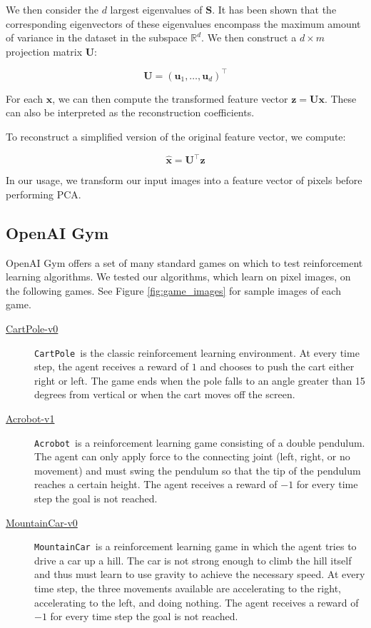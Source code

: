 \documentclass[11pt]{article}
\newcommand{\cp}{\texttt{CartPole}}
\newcommand{\ab}{\texttt{Acrobot}}
\newcommand{\mc}{\texttt{MountainCar}}
\begin{document}
We then consider the $d$ largest eigenvalues of $\mathbf{S}$. It has been shown that the corresponding eigenvectors of these eigenvalues encompass the maximum amount of variance in the dataset in the subspace $\mathbb{R}^d$. We then construct a $d \times m$ projection matrix $\mathbf{U}$:

$$\mathbf{U} = (\mathbf{u}_1, \ldots, \mathbf{u}_d)^\top$$

For each $\mathbf{x}$, we can then compute the transformed feature vector $\mathbf{z} = \mathbf{U}\mathbf{x}$. These can also be interpreted as the reconstruction coefficients.

To reconstruct a simplified version of the original feature vector, we compute:

$$\hat{\mathbf{x}} = \mathbf{U}^\top \mathbf{z}$$

In our usage, we transform our input images into a feature vector of pixels before performing PCA.


\subsection{OpenAI Gym}

OpenAI Gym \cite{brockman2016openai} offers a set of many standard games on which to test reinforcement learning algorithms. We tested our algorithms, which learn on pixel images, on the following games. See Figure \ref{fig:game_images} for sample images of each game.

\begin{description}
    \item[\href{https://gym.openai.com/envs/CartPole-v0/}{CartPole-v0}] \cp~is the classic reinforcement learning environment. At every time step, the agent receives a reward of $1$ and chooses to push the cart either right or left. The game ends when the pole falls to an angle greater than 15 degrees from vertical or when the cart moves off the screen. 
    \item[\href{https://gym.openai.com/envs/Acrobot-v1/}{Acrobot-v1}] \ab~is a reinforcement learning game consisting of a double pendulum. The agent can only apply force to the connecting joint (left, right, or no movement) and must swing the pendulum so that the tip of the pendulum reaches a certain height. The agent receives a reward of $-1$ for every time step the goal is not reached.
    \item[\href{https://gym.openai.com/envs/MountainCar-v0/}{MountainCar-v0}] \mc~is a reinforcement learning game in which the agent tries to drive a car up a hill. The car is not strong enough to climb the hill itself and thus must learn to use gravity to achieve the necessary speed. At every time step, the three movements available are accelerating to the right, accelerating to the left, and doing nothing. The agent receives a reward of $-1$ for every time step the goal is not reached. 
\end{description}
\end{document}

